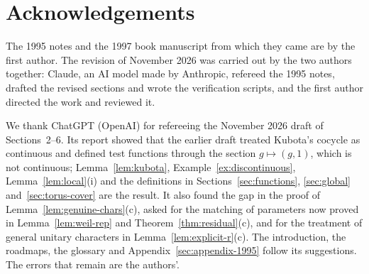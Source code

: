 \documentclass[11pt]{article}
\numberwithin{equation}{section}
\theoremstyle{plain}
\theoremstyle{definition}
\theoremstyle{remark}
\begin{document}
\tableofcontents









\section*{Acknowledgements}

The 1995 notes and the 1997 book manuscript from which they came are by
the first author. The revision of November 2026 was carried out by the
two authors together: Claude, an AI model made by Anthropic, refereed the
1995 notes, drafted the revised sections and wrote the verification
scripts, and the first author directed the work and reviewed it.

We thank ChatGPT (OpenAI) for refereeing the November 2026 draft of
Sections~2--6. Its report showed that the earlier draft treated Kubota's
cocycle as continuous and defined test functions through the section
$g\mapsto(g,1)$, which is not continuous; Lemma~\ref{lem:kubota},
Example~\ref{ex:discontinuous}, Lemma~\ref{lem:local}(i) and the
definitions in Sections~\ref{sec:functions}, \ref{sec:global}
and~\ref{sec:torus-cover} are the result. It also found the gap in the
proof of Lemma~\ref{lem:genuine-chars}(c), asked for the matching of
parameters now proved in Lemma~\ref{lem:weil-rep} and
Theorem~\ref{thm:residual}(c), and for the treatment of general unitary
characters in Lemma~\ref{lem:explicit-r}(c). The introduction, the
roadmaps, the glossary and Appendix~\ref{sec:appendix-1995} follow its
suggestions. The errors that remain are the authors'.

\appendix



\end{document}
